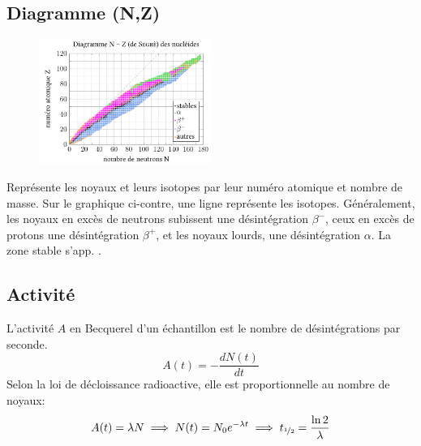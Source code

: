 \documentclass[a5paper,10pt]{article}
\begin{document}
\subsection{Diagramme (N,Z)}
\begin{figure}
  \vspace{-3em}
  \includegraphics[width=0.5\textwidth, angle=0]{./DiagrammeNZ/diagramme_NZ.pdf}
\end{figure}
Représente les noyaux et leurs isotopes par leur numéro atomique et nombre de masse. Sur le graphique ci-contre, une ligne représente les isotopes. Généralement, les noyaux en excès de neutrons subissent une désintégration $\beta^-$, ceux en excès de protons une désintégration $\beta^+$, et les noyaux lourds, une désintégration $\alpha$. La zone stable s'app. .

\vspace{0.4em}
\subsection{Activité}
L'activité $A$ en Becquerel d'un échantillon est le nombre de désintégrations par seconde.
  \[
    A(t)=-\frac{dN(t)}{dt}
  \]
  Selon la loi de décloissance radioactive, elle est proportionnelle au nombre de noyaux:
  \[
    A(t)=\lambda N \implies N(t)=N_0 e^{-\lambda t} \implies t_{\nicefrac{1}{2}}=\frac{\ln 2}{\lambda}
  \]
  
\vspace{0.4em}
\end{document}
